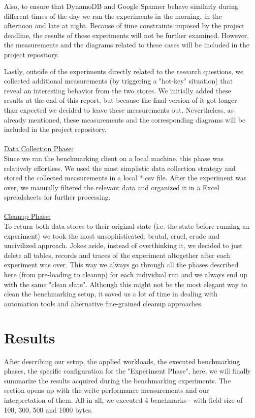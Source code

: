 \documentclass[letterpaper, 10 pt, conference]{ieeeconf}  %
\begin{document}
Also, to ensure that DynamoDB and Google Spanner behave similarly during different times of the day we ran the experiments in the morning, in the afternoon and late at night. Because of time constraints imposed by the project deadline, the results of these experiments will not be further examined. However, the measurements and the diagrams related to these cases will be included in the project repository.\par
Lastly, outside of the experiments directly related to the research questions, we collected additional measurements (by triggering a "hot-key" situation) that reveal an interesting behavior from the two stores. We initially added these results at the end of this report, but because the final version of it got longer than expected we decided to leave these measurements out. Nevertheless, as already mentioned, these measurements and the corresponding diagrams will be included in the project repository.
\\
\\
\underline{Data Collection Phase:}
\\
Since we ran the benchmarking client on a local machine, this phase was relatively effortless. We used the most simplistic data collection strategy and stored the collected measurements in a local *.csv file. After the experiment was over, we manually filtered the relevant data and organized it in a Excel spreadsheets for further processing.
\\
\\
\underline{Cleanup Phase:}
\\
To return both data stores to their original state (i.e. the state before running an experiment) we took the most unsophisticated, brutal, cruel, crude and uncivilized approach. Jokes aside, instead of overthinking it, we decided to just delete all tables, records and traces of the experiment altogether after each experiment was over. This way we always go through all the phases described here (from pre-loading to cleanup) for each individual run and we always end up with the same "clean slate". Although this might not be the most elegant way to clean the benchmarking setup, it saved us a lot of time in dealing with automation tools and alternative fine-grained cleanup approaches. 

\section{Results}
After describing our setup, the applied workloads, the executed benchmarking phases, the specific configuration for the "Experiment Phase", here, we will finally summarize the results acquired during the benchmarking experiments. The section opens up with the write performance measurements and our interpretation of them. All in all, we executed 4 benchmarks - with field size of 100, 300, 500 and 1000 bytes. 
\end{document}
